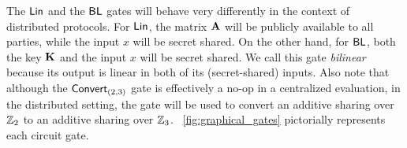 \noindent The $\textnormal{\textsf{Lin}}$ and the $\textnormal{\textsf{BL}}$ gates will behave very differently in the context of distributed protocols. For $\textnormal{\textsf{Lin}}$, the matrix $\mat{A}$ will be publicly available to all parties, while the input $x$ will be secret shared. On the other hand, for $\textnormal{\textsf{BL}}$, both the key $\mat{K}$ and the input $x$ will be secret shared. We call this gate \textit{bilinear} because its output is linear in both of its (secret-shared) inputs. Also note that although the $\textnormal{\textsf{Convert}}_{(2,3)}$ gate is effectively a no-op in a centralized evaluation, in the distributed setting, the gate will be used to convert an additive sharing over $\mathbb{Z}_2$ to an additive sharing over $\mathbb{Z}_3$. \fig~\ref{fig:graphical_gates} pictorially represents each circuit gate.




